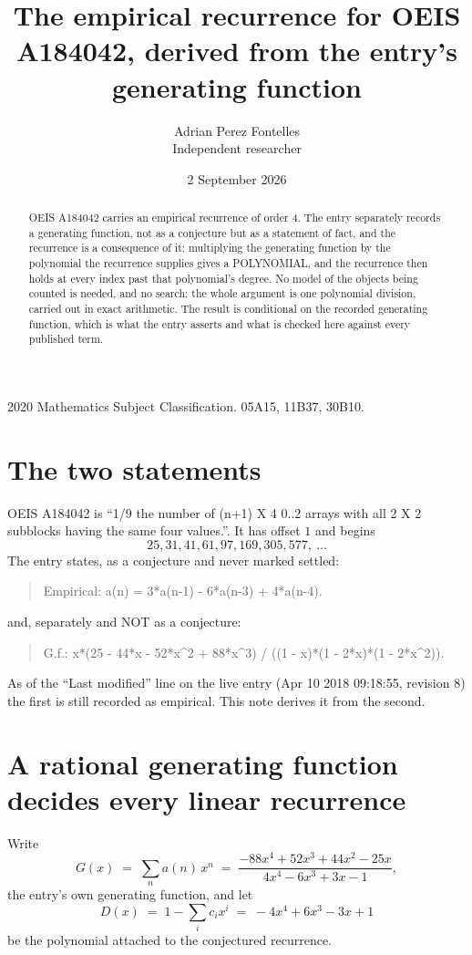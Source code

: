\documentclass[11pt,a4paper]{article}
\title{The empirical recurrence for OEIS A184042, derived from the entry's generating function}
\author{Adrian Perez Fontelles\\ \small Independent researcher}
\date{2 September 2026}
\theoremstyle{plain}
\theoremstyle{definition}
\begin{document}
\maketitle

\begin{abstract}
OEIS A184042 carries an empirical recurrence of order $4$. The entry separately records a
generating function, not as a conjecture but as a statement of fact, and the recurrence is a
consequence of it: multiplying the generating function by the polynomial the recurrence
supplies gives a POLYNOMIAL, and the recurrence then holds at every index past that
polynomial's degree. No model of the objects being counted is needed, and no search: the
whole argument is one polynomial division, carried out in exact arithmetic. The result is
conditional on the recorded generating function, which is what the entry asserts and what is
checked here against every published term.
\end{abstract}

\noindent\small 2020 Mathematics Subject Classification. 05A15, 11B37, 30B10.\normalsize

\section{The two statements}

OEIS A184042 is ``1/9 the number of (n+1) X 4 0..2 arrays with all 2 X 2 subblocks having the same four values.''. It has offset $1$ and begins
\[
25, 31, 41, 61, 97, 169, 305, 577,\ \dots
\]
The entry states, as a conjecture and never marked settled:
\begin{quote}
Empirical: a(n) = 3*a(n-1) - 6*a(n-3) + 4*a(n-4).
\end{quote}
and, separately and NOT as a conjecture:
\begin{quote}
G.f.: x*(25 - 44*x - 52*x\^{}2 + 88*x\^{}3) / ((1 - x)*(1 - 2*x)*(1 - 2*x\^{}2)).
\end{quote}
As of the ``Last modified'' line on the live entry (Apr 10 2018 09:18:55, revision 8) the first is still
recorded as empirical. This note derives it from the second.

\section{A rational generating function decides every linear recurrence}

Write
\[
G(x)\;=\;\sum_{n}a(n)\,x^{n}\;=\;\frac{- 88 x^{4} + 52 x^{3} + 44 x^{2} - 25 x}{4 x^{4} - 6 x^{3} + 3 x - 1},
\]
the entry's own generating function, and let
\[
D(x)\;=\;1-\sum_i c_i x^{i}\;=\;- 4 x^{4} + 6 x^{3} - 3 x + 1
\]
be the polynomial attached to the conjectured recurrence.
\end{document}
